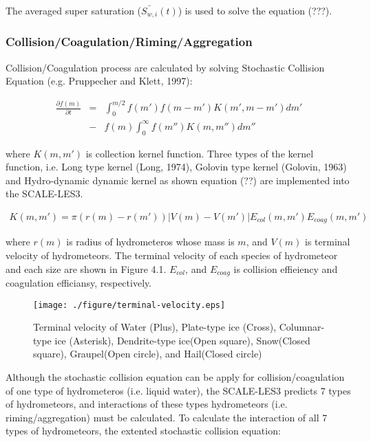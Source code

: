 The averaged super saturation ($\bar{S_{w,i}}(t)$) is used to solve the equation (???).

\subsubsection{Collision/Coagulation/Riming/Aggregation}
Collision/Coagulation process are calculated by solving Stochastic Collision Equation (e.g. Pruppecher and Klett, 1997):

\begin{eqnarray}
\frac{\partial f(m)}{\partial t}&=&\int_0^{m/2}f(m')f(m-m')K(m',m-m')dm' \nonumber\\
&-&f(m)\int_0^{\infty}f(m'')K(m,m'')dm''
\end{eqnarray}

where $K(m,m')$ is collection kernel function. Three types of the kernel function, i.e. Long type kernel (Long, 1974), Golovin type kernel (Golovin, 1963) and Hydro-dynamic dynamic kernel as shown equation (??) are implemented into the SCALE-LES3.

\begin{eqnarray}
K(m,m')=\pi(r(m)-r(m'))\left| V(m)-V(m')\right |E_{col}(m,m')E_{coag}(m,m')
\end{eqnarray}

where $r(m)$ is radius of hydrometeros whose mass is $m$, and $V(m)$ is terminal velocity of hydrometeors. The terminal velocity of each species of hydrometeor and each size are shown in Figure 4.1. $E_{col}$, and $E_{coag}$ is collision effieiency and coagulation efficiansy, respectively.\\

\begin{figure}[h]
\begin{center}
\texttt{[image: ./figure/terminal-velocity.eps]}
\end{center}
\caption{Terminal velocity of Water (Plus), Plate-type ice (Cross), Columnar-type ice (Asterisk), Dendrite-type ice(Open square), Snow(Closed square), Graupel(Open circle), and Hail(Closed circle)}
\end{figure}


Although the stochastic collision equation can be apply for collision/coagulation of one type of hydrometeros (i.e. liquid water), the SCALE-LES3 predicts 7 types of hydrometeors, and interactions of these types hydrometeors (i.e. riming/aggregation) must be calculated. To calculate the interaction of all 7 types of hydrometeors, the extented stochastic collision equation:


